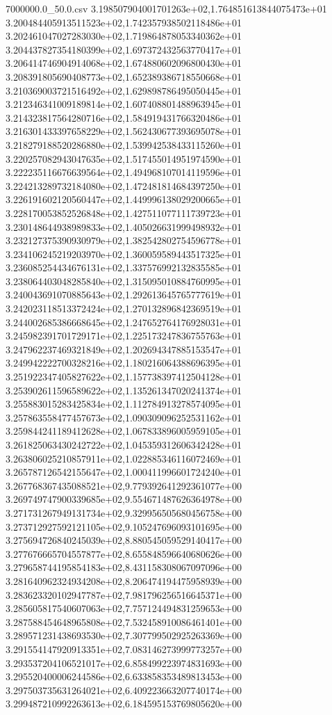 \begin{filecontents*}{7000000.0_50.0.csv}
3.198507904001701263e+02,1.764851613844075473e+01
3.200484405913511523e+02,1.742357938502118486e+01
3.202461047027283030e+02,1.719864878053340362e+01
3.204437827354180399e+02,1.697372432563770417e+01
3.206414746904914068e+02,1.674880602096800430e+01
3.208391805690408773e+02,1.652389386718550668e+01
3.210369003721516492e+02,1.629898786495050445e+01
3.212346341009189814e+02,1.607408801488963945e+01
3.214323817564280716e+02,1.584919431766320486e+01
3.216301433397658229e+02,1.562430677393695078e+01
3.218279188520286880e+02,1.539942538433115260e+01
3.220257082943047635e+02,1.517455014951974590e+01
3.222235116676639564e+02,1.494968107014119596e+01
3.224213289732184080e+02,1.472481814684397250e+01
3.226191602120560447e+02,1.449996138029200665e+01
3.228170053852526848e+02,1.427511077111739723e+01
3.230148644938989833e+02,1.405026631999498932e+01
3.232127375390930979e+02,1.382542802754596778e+01
3.234106245219203970e+02,1.360059589443517325e+01
3.236085254434676131e+02,1.337576992132835585e+01
3.238064403048285840e+02,1.315095010884760995e+01
3.240043691070885643e+02,1.292613645765777619e+01
3.242023118513372424e+02,1.270132896842369519e+01
3.244002685386668645e+02,1.247652764176928031e+01
3.245982391701729171e+02,1.225173247836755763e+01
3.247962237469321849e+02,1.202694347885153547e+01
3.249942222700328216e+02,1.180216064388696395e+01
3.251922347405827622e+02,1.157738397412504128e+01
3.253902611596589622e+02,1.135261347020241374e+01
3.255883015283425834e+02,1.112784913278574095e+01
3.257863558477457673e+02,1.090309096252531162e+01
3.259844241189412628e+02,1.067833896005959105e+01
3.261825063430242722e+02,1.045359312606342428e+01
3.263806025210857911e+02,1.022885346116072469e+01
3.265787126542155647e+02,1.000411996601724240e+01
3.267768367435088521e+02,9.779392641292361077e+00
3.269749747900339685e+02,9.554671487626364978e+00
3.271731267949131734e+02,9.329956505680456758e+00
3.273712927592121105e+02,9.105247696093101695e+00
3.275694726840245039e+02,8.880545059529140417e+00
3.277676665704557877e+02,8.655848596640680626e+00
3.279658744195854183e+02,8.431158308067097096e+00
3.281640962324934208e+02,8.206474194475958939e+00
3.283623320102947787e+02,7.981796256516645371e+00
3.285605817540607063e+02,7.757124494831259653e+00
3.287588454648965808e+02,7.532458910086461401e+00
3.289571231438693530e+02,7.307799502925263369e+00
3.291554147920913351e+02,7.083146273999773257e+00
3.293537204106521017e+02,6.858499223974831693e+00
3.295520400006244586e+02,6.633858353489813453e+00
3.297503735631264021e+02,6.409223663207740174e+00
3.299487210992263613e+02,6.184595153769805620e+00

\end{filecontents*}
